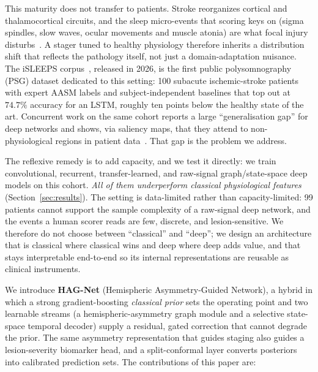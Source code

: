 \documentclass[journal]{IEEEtran}
\begin{document}
This maturity does not transfer to patients. Stroke reorganizes cortical and
thalamocortical circuits, and the sleep micro-events that scoring keys on (sigma
spindles, slow waves, ocular movements and muscle atonia) are what
focal injury disturbs~\cite{gottselig2002stroke,fernandez2019spindles,
simpson2023laterality}. A stager tuned to healthy physiology therefore inherits a
distribution shift that reflects the pathology itself, not just a domain-adaptation
nuisance. The iSLEEPS corpus~\cite{maiti2026isleeps}, released in
2026, is the first public polysomnography (PSG) dataset dedicated to this setting:
100 subacute ischemic-stroke patients with expert AASM labels and
subject-independent baselines that top out at $74.7\%$ accuracy for an LSTM,
roughly ten points below the healthy state of the art. Concurrent work on the same
cohort reports a large ``generalisation gap'' for deep networks and shows, via
saliency maps, that they attend to non-physiological regions in patient
data~\cite{bose2026gap}. That gap is the problem we address.

The reflexive remedy is to add capacity, and we test it directly: we train
convolutional, recurrent, transfer-learned, and raw-signal graph/state-space deep
models on this cohort. \emph{All of them underperform classical physiological
features} (Section~\ref{sec:results}). The setting is data-limited rather than
capacity-limited: 99 patients cannot support the sample complexity of a
raw-signal deep network, and the events a human scorer reads are few,
discrete, and lesion-sensitive. We therefore do not choose between ``classical''
and ``deep''; we design an architecture that is classical where classical wins and
deep where deep adds value, and that stays interpretable end-to-end so its
internal representations are reusable as clinical instruments.

We introduce \textbf{HAG-Net} (Hemispheric Asymmetry-Guided Network), a hybrid in
which a strong gradient-boosting \emph{classical prior} sets the operating point
and two learnable streams (a hemispheric-asymmetry graph module and a selective
state-space temporal decoder) supply a residual, gated correction that cannot
degrade the prior. The same asymmetry representation that
guides staging also guides a lesion-severity biomarker head, and a split-conformal
layer converts posteriors into calibrated prediction sets. The contributions of
this paper are:
\end{document}
